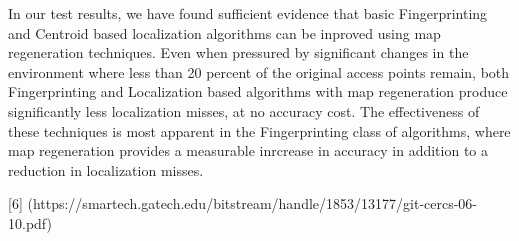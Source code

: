 \documentclass{sig-alternate-br}
\begin{document}
In our test results, we have found sufficient evidence that basic Fingerprinting and Centroid based localization algorithms can be inproved using map regeneration techniques. Even when pressured by significant changes in the environment where less than 20 percent of the original access points remain, both Fingerprinting and Localization based algorithms with map regeneration produce significantly less localization misses, at no accuracy cost. The effectiveness of these techniques is most apparent in the Fingerprinting class of algorithms, where map regeneration provides a measurable inrcrease in accuracy in addition to a reduction in localization misses.







\vspace{120 mm}


  
[6] (https://smartech.gatech.edu/bitstream/handle/1853/13177/git-cercs-06-10.pdf)
%
%



\balancecolumns
\end{document}
